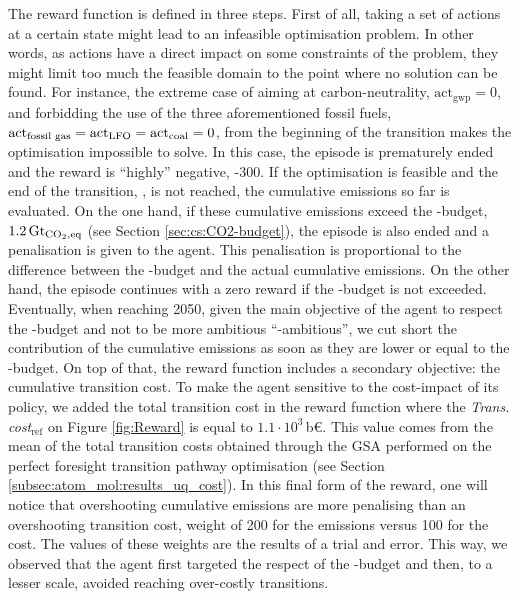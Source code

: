 The reward function is defined in three steps. First of all, taking a set of actions at a certain state might lead to an infeasible optimisation problem. In other words, as actions have a direct impact on some constraints of the problem, they might limit too much the feasible domain to the point where no solution can be found. For instance, the extreme case of aiming at carbon-neutrality, \ie $\mathrm{act}_{\mathrm{gwp}}=0$, and forbidding the use of the three aforementioned fossil fuels, \ie $\mathrm{act}\textsubscript{fossil gas}=\mathrm{act}\textsubscript{LFO}=\mathrm{act}\textsubscript{coal}=0$,  from the beginning of the transition makes the optimisation impossible to solve. In this case, the episode is prematurely ended and the reward is ``highly'' negative, -300. If the optimisation is feasible and the end of the transition, , is not reached, the cumulative emissions so far is evaluated. On the one hand, if these cumulative emissions exceed the -budget, $1.2\,\text{Gt}_{\ce{CO2},\text{eq}}$ (see Section \ref{sec:cs:CO2-budget}), the episode is also ended and a penalisation is given to the agent. This penalisation is proportional to the difference between the -budget and the actual cumulative emissions.  On the other hand, the episode continues with a zero reward if the -budget is not exceeded. Eventually, when reaching 2050, given the main objective of the agent to respect the -budget and not to be more ambitious ``-ambitious'', we cut short the contribution of the cumulative emissions as soon as they are lower or equal to the -budget.  On top of that, the reward function includes a secondary objective: the cumulative transition cost. To make the agent sensitive to the cost-impact of its policy, we added the total transition cost in the reward function where the \emph{Trans. cost$_{\text{ref}}$} on Figure \ref{fig:Reward} is equal to $1.1\cdot10^3$\,b€. This value comes from the mean of the total transition costs obtained through the \gls{GSA} performed on the perfect foresight transition pathway optimisation (see Section \ref{subsec:atom_mol:results_uq_cost}). In this final form of the reward, one will notice that overshooting cumulative emissions are more penalising than an overshooting transition cost, \ie weight of 200 for the emissions versus 100 for the cost. The values of these weights are the results of a trial and error. This way, we observed that the agent first targeted the respect of the -budget and then, to a lesser scale, avoided reaching over-costly transitions.

